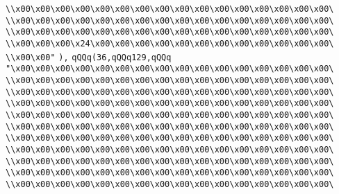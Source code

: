 \verb|\\x00\x00\x00\x00\x00\x00\x00\x00\x00\x00\x00\x00\x00\x00\x00\x00\|\newline
\verb|\\x00\x00\x00\x00\x00\x00\x00\x00\x00\x00\x00\x00\x00\x00\x00\x00\|\newline
\verb|\\x00\x00\x00\x00\x00\x00\x00\x00\x00\x00\x00\x00\x00\x00\x00\x00\|\newline
\verb|\\x00\x00\x00\x24\x00\x00\x00\x00\x00\x00\x00\x00\x00\x00\x00\x00\|\newline
\verb|\\x00\x00"|\newline
\verb|),|\newline
\verb|qQQq(36,qQQq129,qQQq|\newline
\verb|"\x00\x00\x00\x00\x00\x00\x00\x00\x00\x00\x00\x00\x00\x00\x00\x00\|\newline
\verb|\\x00\x00\x00\x00\x00\x00\x00\x00\x00\x00\x00\x00\x00\x00\x00\x00\|\newline
\verb|\\x00\x00\x00\x00\x00\x00\x00\x00\x00\x00\x00\x00\x00\x00\x00\x00\|\newline
\verb|\\x00\x00\x00\x00\x00\x00\x00\x00\x00\x00\x00\x00\x00\x00\x00\x00\|\newline
\verb|\\x00\x00\x00\x00\x00\x00\x00\x00\x00\x00\x00\x00\x00\x00\x00\x00\|\newline
\verb|\\x00\x00\x00\x00\x00\x00\x00\x00\x00\x00\x00\x00\x00\x00\x00\x00\|\newline
\verb|\\x00\x00\x00\x00\x00\x00\x00\x00\x00\x00\x00\x00\x00\x00\x00\x00\|\newline
\verb|\\x00\x00\x00\x00\x00\x00\x00\x00\x00\x00\x00\x00\x00\x00\x00\x00\|\newline
\verb|\\x00\x00\x00\x00\x00\x00\x00\x00\x00\x00\x00\x00\x00\x00\x00\x00\|\newline
\verb|\\x00\x00\x00\x00\x00\x00\x00\x00\x00\x00\x00\x00\x00\x00\x00\x00\|\newline
\verb|\\x00\x00\x00\x00\x00\x00\x00\x00\x00\x00\x00\x00\x00\x00\x00\x00\|\newline
